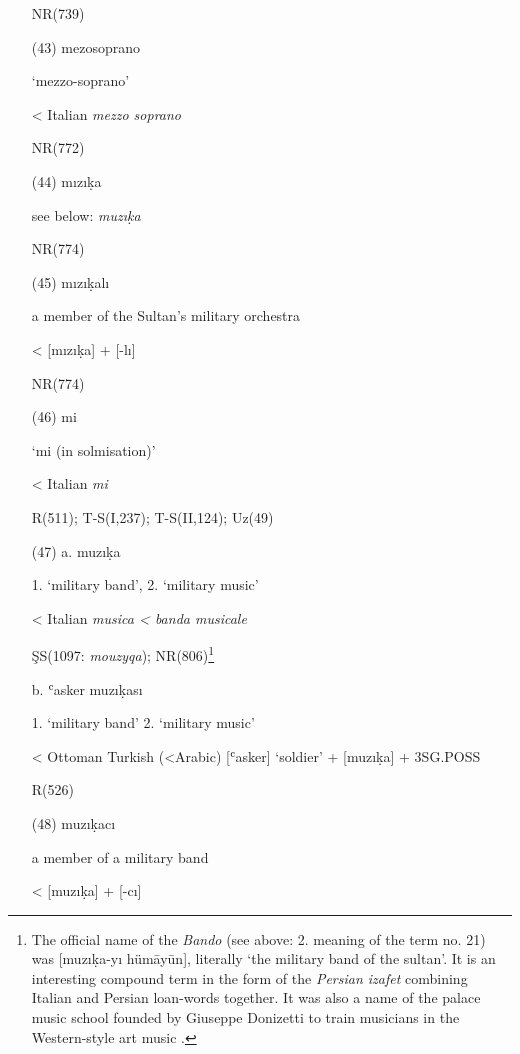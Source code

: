 \documentclass[output=paper,colorlinks,citecolor=brown,arabicfont,chinesefont]{langscibook}
\begin{document}
\begin{itemize}
    NR(739)		
    \item[(43)] mezosoprano {}

    ‘mezzo-soprano’

    < Italian \emph{mezzo soprano}

    NR(772)
    \item[(44)] mızıḳa {} 

    see below: \emph{muzıḳa}

    NR(774)
    \item[(45)] mızıḳalı {}

    a member of the Sultan’s military orchestra

    < {}  [mızıḳa] + {} [-lı]

    NR(774) 
    \item[(46)] mi {}

    ‘mi (in solmisation)’ 

    < Italian \emph{mi}

    R(511); T-S(I,237); T-S(II,124); Uz(49) 
    \item[(47)] a. muzıḳa {} 

    1. ‘military band’, 2. ‘military music’

    < Italian \emph{musica < banda musicale}

    		ŞS(1097: \emph{mouzyqa}); NR(806)\footnote{The official name of the \emph{Bando} (see above: 2. meaning of the term no. 21) was {} [muzıḳa-yı hümāyūn], literally ‘the military band of the sultan’. It is an interesting compound term in the form of the \emph{Persian izafet} combining Italian and Persian loan-words together. It was also a name of the palace music school founded by Giuseppe Donizetti to train musicians in the Western-style art music \citep{Ozcan2020}.}


    b. ʿasker muzıḳası {}

    1. ‘military band’ 2. ‘military music’

    < Ottoman Turkish (<Arabic) {} [ʿasker] ‘soldier’ + {} [muzıḳa] + 3SG.POSS

    R(526)
    \item[(48)] muzıḳacı {}

    a member of a military band

    < {} [muzıḳa] + {} [-cı]


\end{itemize}
\end{document}
